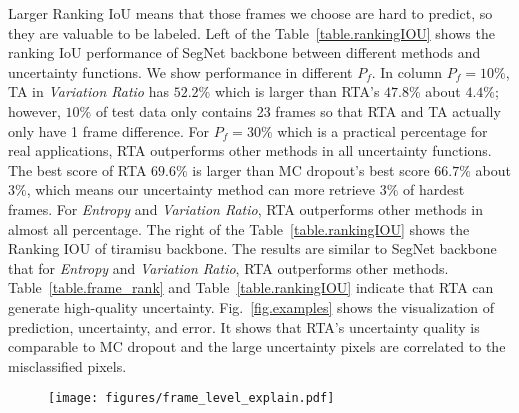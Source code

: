 Larger Ranking IoU means that those frames we choose are hard to predict, so they are valuable to be labeled. Left of the Table~\ref{table.rankingIOU} shows the ranking IoU performance of SegNet backbone between different methods and uncertainty functions. We show performance in different $P_{f}$. In column $P_{f}=10\%$, TA in \textit{Variation Ratio} has $52.2\%$ which is larger than RTA's $47.8\%$ about $4.4\%$; however, $10\%$ of test data only contains 23 frames so that RTA and TA actually only have 1 frame difference. For $P_{f}=30\%$ which is a practical percentage for real applications, RTA outperforms other methods in all uncertainty functions. The best score of RTA $69.6\%$ is larger than MC dropout's best score $66.7\%$ about $3\%$, which means our uncertainty method can more retrieve $3\%$ of hardest frames. For \textit{Entropy} and \textit{Variation Ratio}, RTA outperforms other methods in almost all percentage. The right of the Table~\ref{table.rankingIOU} shows the Ranking IOU of tiramisu backbone. The results are similar to SegNet backbone that for \textit{Entropy} and \textit{Variation Ratio}, RTA outperforms other methods. Table~\ref{table.frame_rank} and Table~\ref{table.rankingIOU} indicate that RTA can generate high-quality uncertainty. Fig.~\ref{fig.examples} shows the visualization of prediction, uncertainty, and error. It shows that RTA's uncertainty quality is comparable to MC dropout and the large uncertainty pixels are correlated to the misclassified pixels. 
\begin{figure}[t]
\begin{center}   
\texttt{[image: figures/frame\_level\_explain.pdf]}
\small \caption{\small {}}

\label{fig.frame_level_explain}
\end{center}
\end{figure}




